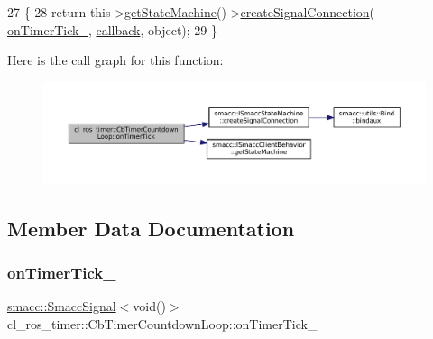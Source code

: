 \begin{DoxyCode}
27     \{
28         \textcolor{keywordflow}{return} this->\hyperlink{classsmacc_1_1ISmaccClientBehavior_a9d55a85bf0a920033805a3c050de2019}{getStateMachine}()->\hyperlink{classsmacc_1_1ISmaccStateMachine_adf0f42ade0c65cc471960fe2a7c42da2}{createSignalConnection}(
      \hyperlink{classcl__ros__timer_1_1CbTimerCountdownLoop_a9df6547f8ddf45107d8850d8a1a92cf4}{onTimerTick\_}, \hyperlink{servers_2opencv__perception__node_2opencv__perception__node_8cpp_a050e697bd654facce10ea3f6549669b3}{callback}, \textcolor{keywordtype}{object});
29     \}
\end{DoxyCode}
Here is the call graph for this function\+:
\nopagebreak
\begin{figure}[H]
\begin{center}
\leavevmode
\includegraphics[width=350pt]{classcl__ros__timer_1_1CbTimerCountdownLoop_ad251cc8444ca7070f64658bbb77e1275_cgraph}
\end{center}
\end{figure}


\subsection{Member Data Documentation}
\mbox{\label{classcl__ros__timer_1_1CbTimerCountdownLoop_a9df6547f8ddf45107d8850d8a1a92cf4}} 
\subsubsection{\texorpdfstring{on\+Timer\+Tick\+\_\+}{onTimerTick\_}}
{\footnotesize\ttfamily \hyperlink{classsmacc_1_1SmaccSignal}{smacc\+::\+Smacc\+Signal}$<$void()$>$ cl\+\_\+ros\+\_\+timer\+::\+Cb\+Timer\+Countdown\+Loop\+::on\+Timer\+Tick\+\_\+\hspace{0.3cm}{\ttfamily [private]}}



